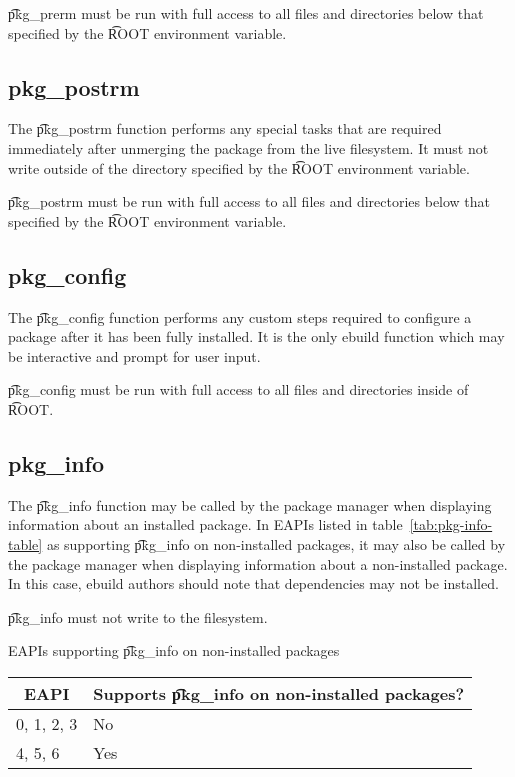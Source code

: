 \t{pkg\_prerm} must be run with full access to all files and directories below that specified by
the \t{ROOT} environment variable.

\subsection{pkg\_postrm}
\label{sec:pkg-postrm-function}

The \t{pkg\_postrm} function performs any special tasks that are required immediately after
unmerging the package from the live filesystem. It must not write outside of the directory specified
by the \t{ROOT} environment variable.

\t{pkg\_postrm} must be run with full access to all files and directories below that specified by
the \t{ROOT} environment variable.

\subsection{pkg\_config}
\label{sec:pkg-config-function}

The \t{pkg\_config} function performs any custom steps required to configure a package after it has been
fully installed. It is the only ebuild function which may be interactive and prompt for user input.

\t{pkg\_config} must be run with full access to all files and directories inside of \t{ROOT}.

\subsection{pkg\_info}
\label{sec:pkg-info-function}

 The \t{pkg\_info} function may be called by the package manager when
displaying information about an installed package. In EAPIs listed in table~\ref{tab:pkg-info-table}
as supporting \t{pkg\_info} on non-installed packages, it may also be called by the package manager
when displaying information about a non-installed package. In this case, ebuild authors should note
that dependencies may not be installed.

\t{pkg\_info} must not write to the filesystem.

\begin{centertable}{EAPIs supporting \t{pkg\_info} on non-installed packages}
    \label{tab:pkg-info-table}
    \begin{tabular}{ll}
      \toprule
      \multicolumn{1}{c}{\textbf{EAPI}} &
      \multicolumn{1}{c}{\textbf{Supports \t{pkg\_info} on non-installed packages?}} \\
      \midrule
      0, 1, 2, 3        & No  \\
      4, 5, 6           & Yes \\
      \bottomrule
    \end{tabular}
\end{centertable}

